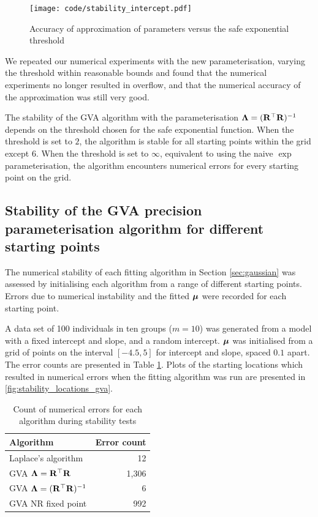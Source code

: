 			\begin{figure}
				\texttt{[image: code/stability\_intercept.pdf]}
				\label{fig:stability_accuracy}
				\caption{Accuracy of approximation of parameters versus the safe exponential threshold}
			\end{figure}
			
			We repeated our numerical experiments with the new parameterisation, varying the threshold within reasonable
			bounds and found that the numerical experiments no longer resulted in overflow, and that the numerical accuracy
			of the approximation was still very good.
			
			The stability of the GVA algorithm with the parameterisation ${\boldsymbol \Lambda} = ({\bf R}^\top {\bf R})^{-1}$ depends on the
			threshold chosen for the safe exponential function. When the threshold is set to $2$, the algorithm is stable
			for all starting points within the grid except $6$. When the threshold is set to $\infty$, equivalent to using
			the naive $\exp$ parameterisation, the algorithm encounters numerical errors for every starting point on the 
			grid.
				
			\subsection{Stability of the GVA precision parameterisation algorithm for different starting points}
					
			The numerical stability of each fitting algorithm in Section \ref{sec:gaussian} was assessed by initialising
			each algorithm from a range of different starting points. Errors due to numerical instability and the fitted
			${\boldsymbol \mu}$ were recorded for each starting point.
					
			A data set of 100 individuals in ten groups ($m=10$) was generated from a model with a fixed intercept and
			slope, and a random intercept. ${\boldsymbol \mu}$ was initialised from a grid of points on the interval $[-4.5, 5]$ for
			intercept and slope, spaced $0.1$ apart. The error counts are presented in Table
			\ref{tab:stability_results}. Plots of the starting locations which resulted in numerical errors when the
			fitting algorithm was run are presented in \ref{fig:stability_locations_gva}.
					
			\begin{table}
				\begin{tabular}{|l|r|}
					\hline
					Algorithm                            & Error count \\
					\hline
					Laplace's algorithm                  & 12          \\
					GVA ${\boldsymbol \Lambda} = {\bf R}^\top {\bf R}$        & 1,306       \\
					GVA ${\boldsymbol \Lambda} = ({\bf R}^\top {\bf R})^{-1}$ & 6           \\
					GVA NR fixed point                   & 992         \\
					\hline
				\end{tabular}
				\caption{Count of numerical errors for each algorithm during stability tests}
				\label{tab:stability_results}
			\end{table}

